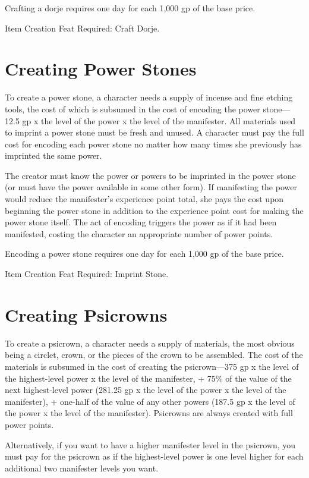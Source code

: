 \documentclass{article}
\begin{document}
Crafting a dorje requires one day for each 1,000 gp of the base price.

Item Creation Feat Required: Craft Dorje.

\section*{\textbf{Creating Power Stones}}

To create a power stone, a character needs a supply of incense and fine etching 
tools, the cost of which is subsumed in the cost of encoding the power stone---12.5 
gp x the level of the power x the level of the manifester. All materials used to 
imprint a power stone must be fresh and unused. A character must pay the full cost 
for encoding each power stone no matter how many times she previously has imprinted 
the same power.

The creator must know the power or powers to be imprinted in the power stone (or 
must have the power available in some other form). If manifesting the power would 
reduce the manifester's experience point total, she pays the cost upon beginning 
the power stone in addition to the experience point cost for making the power stone 
itself. The act of encoding triggers the power as if it had been manifested, costing 
the character an appropriate number of power points.

Encoding a power stone requires one day for each 1,000 gp of the base price.

Item Creation Feat Required: Imprint Stone. 

\section*{\textbf{Creating Psicrowns}}

To create a psicrown, a character needs a supply of materials, the most obvious 
being a circlet, crown, or the pieces of the crown to be assembled. The cost of 
the materials is subsumed in the cost of creating the psicrown---375 gp x the level 
of the highest-level power x the level of the manifester, + 75\% of the value of 
the next highest-level power (281.25 gp x the level of the power x the level of 
the manifester), + one-half of the value of any other powers (187.5 gp x the level 
of the power x the level of the manifester). Psicrowns are always created with 
full power points.

Alternatively, if you want to have a higher manifester level in the psicrown, you 
must pay for the psicrown as if the highest-level power is one level higher for 
each additional two manifester levels you want.
\end{document}
